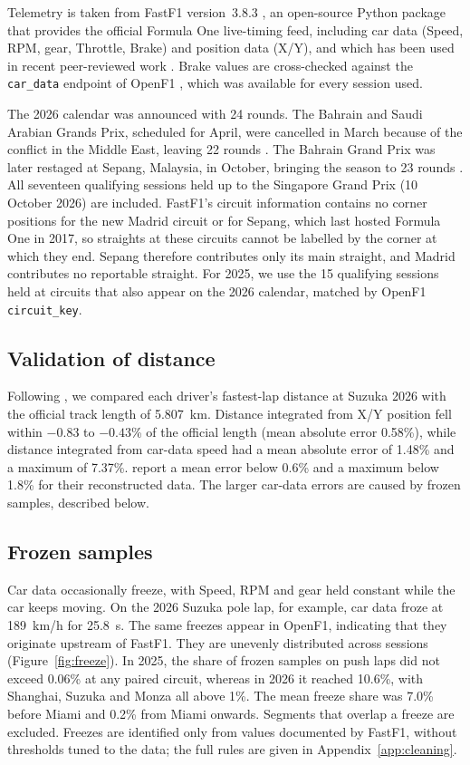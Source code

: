 \documentclass[11pt,a4paper]{article}
\newcommand{\var}[1]{\texttt{#1}}
\begin{document}
Telemetry is taken from FastF1 version~3.8.3 \citep{fastf1}, an open-source Python package that provides the official Formula One live-timing feed, including car data (Speed, RPM, gear, Throttle, Brake) and position data (X/Y), and which has been used in recent peer-reviewed work \citep{cappello2026tire}. Brake values are cross-checked against the \var{car\_data} endpoint of OpenF1 \citep{openf1}, which was available for every session used.

The 2026 calendar was announced with 24 rounds. The Bahrain and Saudi Arabian Grands Prix, scheduled for April, were cancelled in March because of the conflict in the Middle East, leaving 22 rounds \citep{sky2026cancel}. The Bahrain Grand Prix was later restaged at Sepang, Malaysia, in October, bringing the season to 23 rounds \citep{f12026malaysia}. All seventeen qualifying sessions held up to the Singapore Grand Prix (10 October 2026) are included. FastF1's circuit information contains no corner positions for the new Madrid circuit or for Sepang, which last hosted Formula One in 2017, so straights at these circuits cannot be labelled by the corner at which they end. Sepang therefore contributes only its main straight, and Madrid contributes no reportable straight. For 2025, we use the 15 qualifying sessions held at circuits that also appear on the 2026 calendar, matched by OpenF1 \var{circuit\_key}.

\subsection{Validation of distance}

Following \citet{bopaiah2021}, we compared each driver's fastest-lap distance at Suzuka 2026 with the official track length of 5.807~km. Distance integrated from X/Y position fell within $-0.83$ to $-0.43$\% of the official length (mean absolute error 0.58\%), while distance integrated from car-data speed had a mean absolute error of 1.48\% and a maximum of 7.37\%. \citet{bopaiah2021} report a mean error below 0.6\% and a maximum below 1.8\% for their reconstructed data. The larger car-data errors are caused by frozen samples, described below.

\subsection{Frozen samples}
\label{sec:freeze}

Car data occasionally freeze, with Speed, RPM and gear held constant while the car keeps moving. On the 2026 Suzuka pole lap, for example, car data froze at 189~km/h for 25.8~s. The same freezes appear in OpenF1, indicating that they originate upstream of FastF1. They are unevenly distributed across sessions (Figure~\ref{fig:freeze}). In 2025, the share of frozen samples on push laps did not exceed 0.06\% at any paired circuit, whereas in 2026 it reached 10.6\%, with Shanghai, Suzuka and Monza all above 1\%. The mean freeze share was 7.0\% before Miami and 0.2\% from Miami onwards. Segments that overlap a freeze are excluded. Freezes are identified only from values documented by FastF1, without thresholds tuned to the data; the full rules are given in Appendix~\ref{app:cleaning}.
\end{document}
